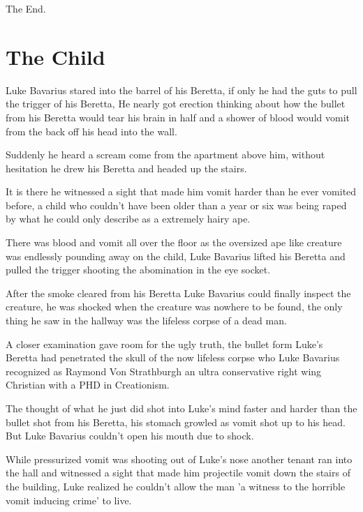 The End. 
 




\chapter{The Child}


Luke Bavarius stared into the barrel of his Beretta, if only he had
the guts to pull the trigger of his Beretta, He nearly got erection
thinking about how the bullet from his Beretta would tear his brain
in half and a shower of blood would vomit from the back off his
head into the wall.



Suddenly he heard a scream come from the apartment above him,
without hesitation he drew his Beretta and headed up the
stairs.



It is there he witnessed a sight that made him vomit harder than he
ever vomited before, a child who couldn't have been older
than a year or six was being raped by what he could only describe
as a extremely hairy ape.



There was blood and vomit all over the floor as the oversized ape
like creature was endlessly pounding away on the child, Luke
Bavarius lifted his Beretta and pulled the trigger shooting the
abomination in the eye socket.



After the smoke cleared from his Beretta Luke Bavarius could
finally inspect the creature, he was shocked when the creature was
nowhere to be found, the only thing he saw in the hallway was the
lifeless corpse of a dead man.



A closer examination gave room for the ugly truth, the bullet form
Luke's Beretta had penetrated the skull of the now lifeless
corpse who Luke Bavarius recognized as Raymond Von Strathburgh an
ultra conservative right wing Christian with a PHD in
Creationism.



The thought of what he just did shot into Luke's mind faster
and harder than the bullet shot from his Beretta, his stomach
growled as vomit shot up to his head. But Luke Bavarius
couldn't open his mouth due to shock.



While pressurized vomit was shooting out of Luke's nose
another tenant ran into the hall and witnessed a sight that made
him projectile vomit down the stairs of the building, Luke realized
he couldn't allow the man 'a witness to the horrible vomit
inducing crime' to live.



